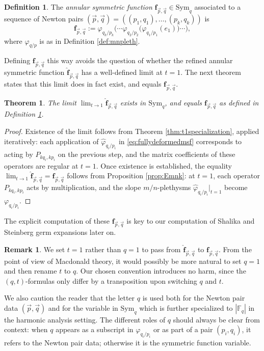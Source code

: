 \documentclass{amsart}
\numberwithin{equation}{section}
\newtheorem{theorem}[lemma]{Theorem}%
\theoremstyle{definition}
\newtheorem{remark}[lemma]{Remark}%
\newtheorem{definition}[lemma]{Definition}%
\def\hat{\widehat}
\def\Sym{{\mathrm{Sym}}}
\newcommand{\frs}{\mathbf{f}_{\vec{p},\vec{q}}}
\newcommand{\fpq}{\frs}
\newcommand{\F}{{\mathbb F}}
\newcommand{\fqrs}{\hat{\mathbf{f}}_{\vec{p},\vec{q}}}
\begin{document}
\begin{definition}\label{def:degmaster}
The {\em annular symmetric function} $\fpq \in \Sym_q$ associated to a sequence of Newton pairs $(\vec p, \vec q) = ((p_1, q_1), \ldots, (p_k, q_k))$ is
$$\fpq := \varphi_{q_k/p_k}\bigl(\cdots \varphi_{q_2/p_2}\bigl(\varphi_{q_1/p_1}(e_1)\bigr) \cdots \bigr),$$
where $\varphi_{q/p}$ is as in Definition \ref{def:mnpleth}.
\end{definition}
Defining $\fpq$ this way avoids the question of whether the refined annular symmetric function $\fqrs$ has a well-defined limit at $t=1$. The next theorem states that this limit does in fact exist, and equals $\fpq$.
\begin{theorem}\label{thm:degfpqformula}
The limit $\lim_{t \to 1} \fqrs$ exists in $\Sym_q$, and equals $\fpq$ as defined in Definition \ref{def:degmaster}.
\end{theorem}
\begin{proof}
Existence of the limit follows from Theorem \ref{thm:t1specialization}, applied iteratively: each application of $\widehat\varphi_{q_i/p_i}$ in \eqref{eq:fullydeformedmsf} corresponds to acting by $P_{kq_i, kp_i}$ on the previous step, and the matrix coefficients of these operators are regular at $t=1$. Once existence is established, the equality $\lim_{t \to 1} \fqrs = \fpq$ follows from Proposition \ref{prop:Emnk}: at $t=1$, each operator $P_{kq_i, kp_i}$ acts by multiplication, and the slope $m/n$-plethysms $\widehat\varphi_{q_i/p_i}|_{t=1}$ become $\varphi_{q_i/p_i}$.
\end{proof}
The explicit computation of these $\fpq$ is key to our computation of Shalika and Steinberg germ expansions later on.
\begin{remark}
\label{rmk:msfdef}
We set $t=1$ rather than $q=1$ to pass from $\fqrs$ to $\fpq$. From the point of view of Macdonald theory, it would possibly be more natural to set $q=1$ and then rename $t$ to $q$. Our chosen convention introduces no harm, since the $(q,t)$-formulas only differ by a transposition upon switching $q$ and $t$.

We also caution the reader that the letter $q$ is used both for the Newton pair data $(\vec{p},\vec{q})$ and for the variable in $\Sym_q$ which is further specialized to $|\F_q|$ in the harmonic analysis setting. The different roles of $q$ should always be clear from context: when $q$ appears as a subscript in $\varphi_{q_i/p_i}$ or as part of a pair $(p_i,q_i)$, it refers to the Newton pair data; otherwise it is the symmetric function variable.
\end{remark}
\end{document}
